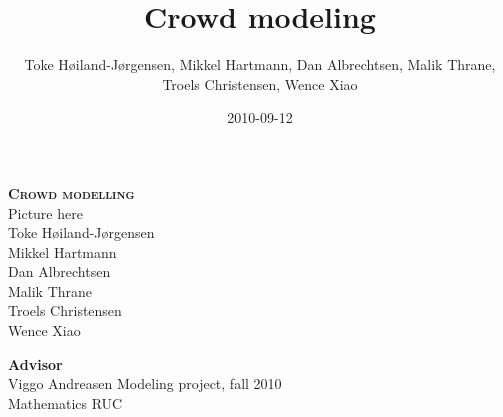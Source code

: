 \documentclass[a4paper,11pt]{scrartcl}
\title{Crowd modeling}
\author{Toke Høiland-Jørgensen, Mikkel Hartmann, Dan Albrechtsen, Malik 
Thrane, Troels Christensen, Wence Xiao}
\date{2010-09-12}
\begin{document}
\begin{titlepage}
    \begin{center}
		\begin{sf}
            {\Huge \textsc{\textbf{Crowd modelling\\[2cm]
            }}} Picture here %
            \\[2cm]

            {\large Toke Høiland-Jørgensen \\
            Mikkel Hartmann\\
            Dan Albrechtsen\\
            Malik Thrane\\
            Troels Christensen\\
            Wence Xiao\\
            [0.5cm] }

            {\small \textbf{Advisor}\\
            Viggo Andreasen}
			\vfill
            Modeling project, fall 2010\\
            Mathematics RUC
		\end{sf}
	\end{center}

    \clearpage
%    
\end{titlepage}

\tableofcontents
\listoffigures

\clearpage


\clearpage

\clearpage

\clearpage

\clearpage

\clearpage

\clearpage

\clearpage

\clearpage


\clearpage
\end{document}
